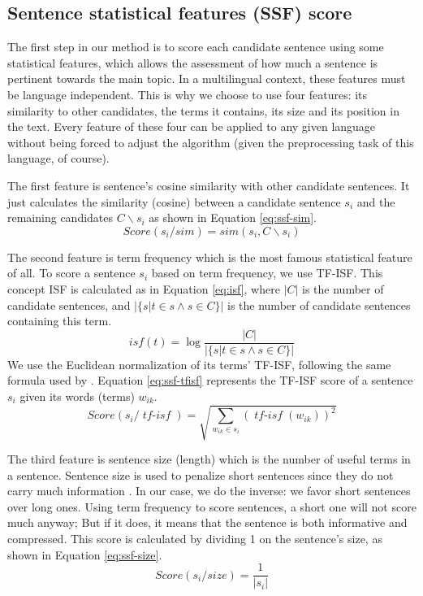 \documentclass[12pt, oneside, a4paper]{article}
\DeclareMathOperator{\tfisf}{\textit{tf-isf}}
\begin{document}
\subsection{Sentence statistical features (SSF) score}

The first step in our method is to score each candidate sentence using some statistical features, which allows the assessment of how much a sentence is pertinent towards the main topic. 
In a multilingual context, these features must be language independent. 
This is why we choose to use four features: its similarity to other candidates, the terms it contains, its size and its position in the text. 
Every feature of these four can be applied to any given language without being forced to adjust the algorithm (given the preprocessing task of this language, of course).

The first feature is sentence's cosine similarity with other candidate sentences. 
It just calculates the similarity (cosine) between a candidate sentence $ s_i $ and the remaining candidates $ C\backslash s_i $ as shown in Equation \ref{eq:ssf-sim}.
\begin{equation}
Score(s_i/ sim) = sim(s_i, C\backslash s_i)
\label{eq:ssf-sim}
\end{equation}

The second feature is term frequency which is the most famous statistical feature of all. 
To score a sentence $ s_i $ based on term frequency, we use TF-ISF.
This concept ISF is calculated as in Equation \ref{eq:isf}, where $ |C| $ is the number of candidate sentences, and $ |\{s | t \in s \wedge s \in C \}| $ is the number of candidate sentences containing this term.
\begin{equation}
isf(t) = \log \frac{|C|}{|\{s | t \in s \wedge s \in C \}|}
\label{eq:isf}
\end{equation}
We use the Euclidean normalization of its terms' TF-ISF, following the same formula used by \citet{04-nobata-sekine}. 
Equation \ref{eq:ssf-tfisf} represents the TF-ISF score of a sentence $ s_i $ given its words (terms) $ w_{ik} $.
\begin{equation}
Score(s_i/ \tfisf) = \sqrt{\sum\limits_{w_{ik} \in s_i} (\tfisf(w_{ik}))^2}
\label{eq:ssf-tfisf}
\end{equation}

The third feature is sentence size (length) which is the number of useful terms in a sentence. 
Sentence size is used to penalize short sentences since they do not carry much information \citep{95-kupiec-al}.
In our case, we do the inverse: we favor short sentences over long ones. 
Using term frequency to score sentences, a short one will not score much anyway; 
But if it does, it means that the sentence is both informative and compressed.
This score is calculated by dividing 1 on the sentence's size, as shown in Equation \ref{eq:ssf-size}.
\begin{equation}
Score(s_i/ size) = \frac{1}{|s_i|}
\label{eq:ssf-size}
\end{equation}
\end{document}
